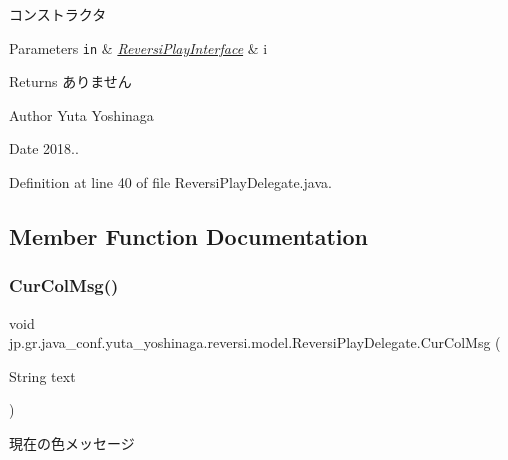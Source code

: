 コンストラクタ 


\begin{DoxyParams}[1]{Parameters}
\mbox{\tt in}  & {\em \hyperlink{interfacejp_1_1gr_1_1java__conf_1_1yuta__yoshinaga_1_1reversi_1_1model_1_1_reversi_play_interface}{Reversi\+Play\+Interface}} & i \\
\hline
\end{DoxyParams}
\begin{DoxyReturn}{Returns}
ありません 
\end{DoxyReturn}
\begin{DoxyAuthor}{Author}
Yuta Yoshinaga 
\end{DoxyAuthor}
\begin{DoxyDate}{Date}
2018.. 
\end{DoxyDate}


Definition at line 40 of file Reversi\+Play\+Delegate.\+java.



\subsection{Member Function Documentation}
\mbox{\label{classjp_1_1gr_1_1java__conf_1_1yuta__yoshinaga_1_1reversi_1_1model_1_1_reversi_play_delegate_a3654121208eb28bbd4972b2835665a73}} 
\subsubsection{\texorpdfstring{Cur\+Col\+Msg()}{CurColMsg()}}
{\footnotesize\ttfamily void jp.\+gr.\+java\+\_\+conf.\+yuta\+\_\+yoshinaga.\+reversi.\+model.\+Reversi\+Play\+Delegate.\+Cur\+Col\+Msg (\begin{DoxyParamCaption}\item[{String}]{text }\end{DoxyParamCaption})}



現在の色メッセージ 


